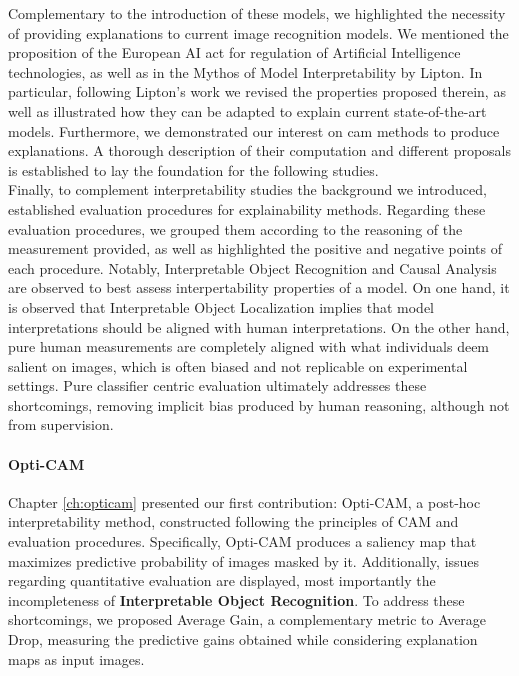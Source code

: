 \noindent Complementary to the introduction of these models, we highlighted the 
necessity of providing explanations to current image recognition models. We mentioned the proposition  
of the European AI act for regulation of Artificial Intelligence technologies, as well as in the 
Mythos of Model Interpretability by Lipton. In particular, following Lipton's work we 
revised the properties proposed therein, as well as illustrated how they can be adapted to explain 
current state-of-the-art models. Furthermore, we demonstrated our interest on \gls{cam} methods 
to produce explanations. A thorough description of their computation and different proposals is 
established to lay the foundation for the following studies.\\

\noindent Finally, to complement interpretability studies the background we introduced, established
evaluation procedures for explainability methods. Regarding these evaluation procedures, we grouped 
them according to the reasoning of the measurement provided, as well as highlighted the positive 
and negative points of each procedure. Notably, Interpretable Object Recognition and 
Causal Analysis are observed to best assess interpertability properties of a model. On one 
hand, it is observed that Interpretable Object Localization implies that model 
interpretations should be aligned with human interpretations. On the other hand, pure human 
measurements are completely aligned with what individuals deem salient on images, which is often 
biased and not replicable on experimental settings. Pure classifier centric evaluation 
ultimately addresses these shortcomings, removing implicit bias produced by human reasoning, 
although not from supervision.\\

\paragraph{Opti-CAM}
\label{sub:conc_opti}
\noindent Chapter \ref{ch:opticam} presented our first contribution: Opti-CAM, a post-hoc 
interpretability method, constructed following the principles of CAM and evaluation 
procedures. Specifically, Opti-CAM produces a saliency map that maximizes predictive probability 
of images masked by it. Additionally, issues regarding quantitative evaluation are displayed, 
most importantly the incompleteness of \textbf{Interpretable Object Recognition}. To address these 
shortcomings, we proposed Average Gain, a complementary metric to Average Drop, measuring 
the predictive gains obtained while considering explanation maps as input images.\\

